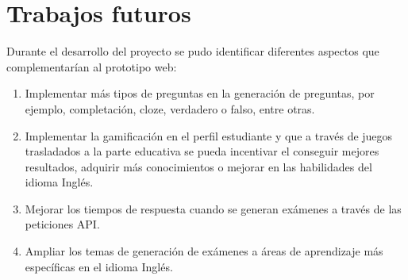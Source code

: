 \documentclass[../Main.tex]{subfiles}
\begin{document}
\section{Trabajos futuros}

    \begin{justify}
    Durante el desarrollo del proyecto se pudo identificar diferentes aspectos que complementarían al prototipo web:
    
    \begin{enumerate}
        \item Implementar más tipos de preguntas en la generación de preguntas, por ejemplo, completación, cloze, verdadero o falso, entre otras.
        
        \item Implementar la gamificación en el perfil estudiante y que a través de juegos trasladados a la parte educativa se pueda incentivar el conseguir mejores resultados, adquirir más conocimientos o mejorar en las habilidades del idioma Inglés.
        
        \item Mejorar los tiempos de respuesta cuando se generan exámenes a través de las peticiones API.
        
        \item Ampliar los temas de generación de exámenes a áreas de aprendizaje más específicas en el idioma Inglés.
    \end{enumerate}
    
    \end{justify}
\end{document}
